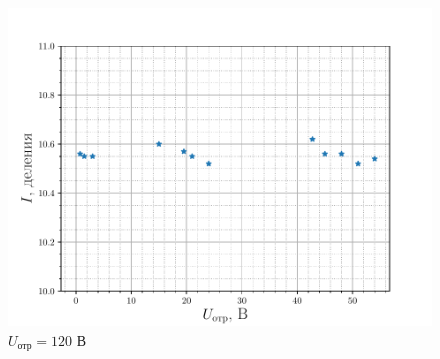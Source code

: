 \begin{figure}[H]
		\centering
		\includegraphics[height=0.4\textheight]{fig/res120V_2}
		\caption{$U_{\text{отр}}=120$ В}
		\label{fig:res120V_2}
\end{figure}

